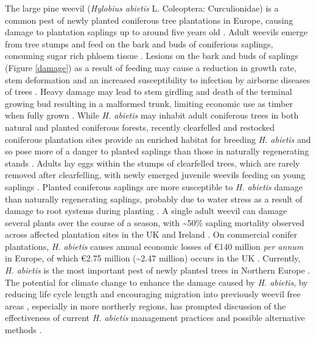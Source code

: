 \documentclass[a4paper, 11pt]{article}
\begin{document}
The large pine weevil (\textit{Hylobius abietis} L. Coleoptera: Curculionidae) is a common pest of newly planted coniferous tree plantations in Europe, causing damage to plantation saplings up to around five years old \citep{Ordlander1997}. Adult weevils emerge from tree stumps and feed on the bark and buds of coniferious saplings, consuming sugar rich phloem tissue \citep{Nordlander1991}. Lesions on the bark and buds of saplings (Figure \ref{damage}) as a result of feeding may cause a reduction in growth rate, stem deformation and an increased susceptibility to infection by airborne diseases of trees \citep{Leather1999}. Heavy damage may lead to stem girdling and death of the terminal growing bud resulting in a malformed trunk, limiting economic use as timber when fully grown \citep{Alfaro1989, Gill1992}. While \textit{H. abietis} may inhabit adult coniferous trees in both natural and planted coniferous forests, recently clearfelled and restocked coniferous plantation sites provide an enriched habitat for breeding \textit{H. abietis} and so pose more of a danger to planted saplings than those in naturally regenerating stands \citep{Willoughby2004, Orlander1999}. Adults lay eggs within the stumps of clearfelled trees, which are rarely removed after clearfelling, with newly emerged juvenile weevils feeding on young saplings \citep{Willoughby2004}. Planted coniferous saplings are more susceptible to \textit{H. abietis} damage than naturally regenerating saplings, probably due to water stress as a result of damage to root systems during planting \citep{Selander1990}. A single adult weevil can damage several plants over the course of a season, with \textasciitilde{}50\% sapling mortality observed across affected plantation sites in the UK and Ireland \citep{Heritage2001}. On commercial conifer plantations, \textit{H. abietis} causes annual economic losses of \euro{}140 million \textit{per annum} in Europe, of which \euro{}2.75 million (\textasciitilde{}\textsterling{}2.47 million) occurs in the UK \citep{Evans2015}. Currently, \textit{H. abietis} is the most important pest of newly planted trees in Northern Europe \citep{Evans2015}. The potential for climate change to enhance the damage caused by \textit{H. abietis}, by reducing life cycle length \citep{Leather1999} and encouraging migration into previously weevil free areas \citep{Inward2012, Barredo2015}, especially in more northerly regions, has prompted discussion of the effectiveness of current \textit{H. abietis} management practices and possible alternative methods \citep{Kapranas2017, McNamara2018}.
\end{document}
